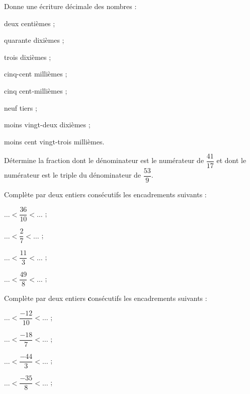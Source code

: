 \begin{exercice}
Donne une écriture décimale des nombres :
\begin{colenumerate}{2}
 \item deux centièmes ;
 \item quarante dixièmes ;
 \item trois dixièmes ;
 \item cinq-cent millièmes ;
 \item cinq cent‑millièmes ;
 \item neuf tiers ;
 \item moins vingt-deux \newline dixièmes ;
 \item moins cent vingt-trois \newline millièmes.
 \end{colenumerate}
\end{exercice}


\begin{exercice}
Détermine la fraction dont le dénominateur est le numérateur de $\dfrac{41}{17}$ et dont le numérateur est le triple du dénominateur de $\dfrac{53}{9}$.
\end{exercice}


\begin{exercice}
Complète par deux entiers consécutifs les encadrements suivants :\\[0.1em]
\begin{colenumerate}{2}
 \item $\ldots < \dfrac{36}{10} < \ldots$ ;
 \vspace{0.5em}
 \item $\ldots < \dfrac{2}{7} < \ldots$ ;
 \item $\ldots < \dfrac{11}{3} < \ldots$ ;
 \item $\ldots < \dfrac{49}{8} < \ldots$ ;
 \end{colenumerate}
\end{exercice}


\begin{exercice}
Complète par deux entiers {\textbf consécutifs} les encadrements suivants :\\[0.1em]
\begin{colenumerate}{2}
 \item $\ldots < \dfrac{- 12}{10} < \ldots$ ;
 \vspace{0.5em}
 \item $\ldots < \dfrac{- 18}{7} < \ldots$ ;
 \item $\ldots < \dfrac{-44}{3} < \ldots$ ;
 \item $\ldots < \dfrac{- 35}{8} < \ldots$ ;
 \end{colenumerate}
\end{exercice}


